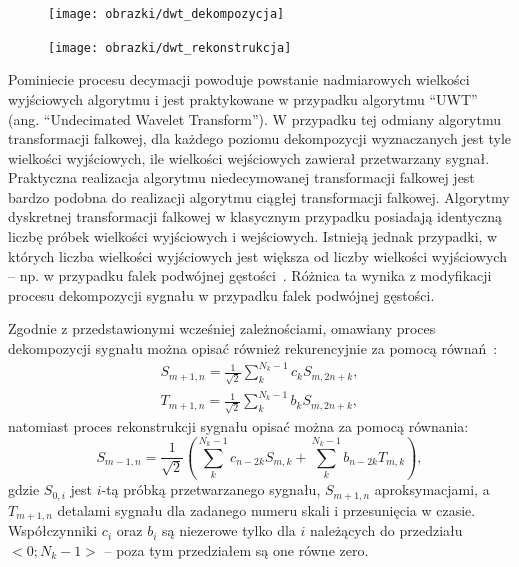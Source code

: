 \begin{figure}[htb!]
\begin{center}
\texttt{[image: obrazki/dwt\_dekompozycja]}
\end{center}
\end{figure}

\begin{figure}[htb!]
\begin{center}
\texttt{[image: obrazki/dwt\_rekonstrukcja]}
\end{center}
\end{figure}

Pominiecie procesu decymacji powoduje powstanie nadmiarowych wielkości wyjściowych algorytmu i jest praktykowane w przypadku algorytmu \enquote{UWT} (ang. \enquote{Undecimated Wavelet Transform}). W przypadku tej odmiany algorytmu transformacji falkowej, dla każdego poziomu dekompozycji wyznaczanych jest tyle wielkości wyjściowych, ile wielkości wejściowych zawierał przetwarzany sygnał. Praktyczna realizacja algorytmu niedecymowanej transformacji falkowej jest bardzo podobna do realizacji algorytmu ciągłej transformacji falkowej. Algorytmy dyskretnej transformacji falkowej w klasycznym przypadku posiadają identyczną liczbę próbek wielkości wyjściowych i wejściowych. Istnieją jednak przypadki, w których liczba wielkości wyjściowych jest większa od liczby wielkości wyjściowych -- np. w przypadku falek podwójnej gęstości~\cite{selenick_ddenusage}. Różnica ta wynika z modyfikacji procesu dekompozycji sygnału w przypadku falek podwójnej gęstości.

Zgodnie z przedstawionymi wcześniej zależnościami, omawiany proces dekompozycji sygnału można opisać również rekurencyjnie za pomocą równań~\cite{wallen_handbook}:
\begin{gather}
S_{m+1,n} = \frac{1}{\sqrt{2}} \sum _{k} ^{N_k-1} c_{k} S_{m,2n+k} \label{eq:dwt_aproxrek}, \\
T_{m+1,n} = \frac{1}{\sqrt{2}} \sum _{k} ^{N_k-1} b_{k} S_{m,2n+k} \label{eq:dwt_detailrek},
\end{gather}
natomiast proces rekonstrukcji sygnału opisać można za pomocą równania:
\begin{equation}
S_{m-1,n} = \frac{1}{\sqrt{2}} \left( \sum _{k} ^{N_k-1} c_{n-2k} S_{m,k} + \sum _{k} ^{N_k-1} b_{n-2k} T_{m,k} \right) \label{eq:dwt_reconrek},
\end{equation}
gdzie $S_{0,i}$ jest $i$-tą próbką przetwarzanego sygnału, $S_{m+1,n}$ aproksymacjami, a $T_{m+1,n}$ detalami sygnału dla zadanego numeru skali i przesunięcia w czasie. Współczynniki $c_i$ oraz $b_i$ są niezerowe tylko dla $i$ należących do przedziału $<0;N_k-1>$ -- poza tym przedziałem są one równe zero.

